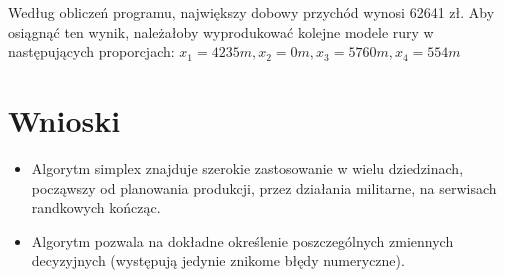 \documentclass[a4paper,11pt]{article}
\begin{document}
Według obliczeń programu, największy dobowy przychód wynosi 62641 zł. Aby osiągnąć ten wynik, należałoby wyprodukować kolejne modele rury w następujących proporcjach:
$ x_{1} = 4235 m, x_{2} = 0 m, x_{3} = 5760 m, x_{4} = 554 m $

\section{Wnioski}

\begin{itemize}
 \item Algorytm simplex znajduje szerokie zastosowanie w wielu dziedzinach, począwszy od planowania produkcji, przez działania militarne, na serwisach randkowych kończąc.
 \item Algorytm pozwala na dokładne określenie poszczególnych zmiennych decyzyjnych (występują jedynie znikome błędy numeryczne).
 
\end{itemize}
\end{document}
